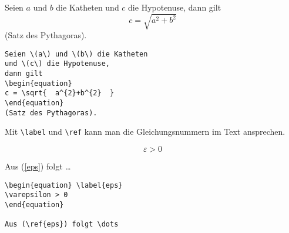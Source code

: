 \exa
Seien \(a\) und \(b\) die Katheten
und \(c\) die Hypotenuse,
dann gilt
\begin{equation}
c = \sqrt{  a^{2}+b^{2}  }
\end{equation}
(Satz des Pythagoras).
\exb
\begin{verbatim}
Seien \(a\) und \(b\) die Katheten
und \(c\) die Hypotenuse,
dann gilt
\begin{equation}
c = \sqrt{  a^{2}+b^{2}  }
\end{equation}
(Satz des Pythagoras).
\end{verbatim}
\exc

Mit \verb|\label| und \verb|\ref| kann man die Gleichungsnummern
im Text ansprechen.

\exa
\begin{equation} \label{eps}
\varepsilon > 0
\end{equation}
 
Aus (\ref{eps}) folgt \dots
\exb
\begin{verbatim}
\begin{equation} \label{eps}
\varepsilon > 0
\end{equation}
 
Aus (\ref{eps}) folgt \dots
\end{verbatim}
\exc
 
 
 
